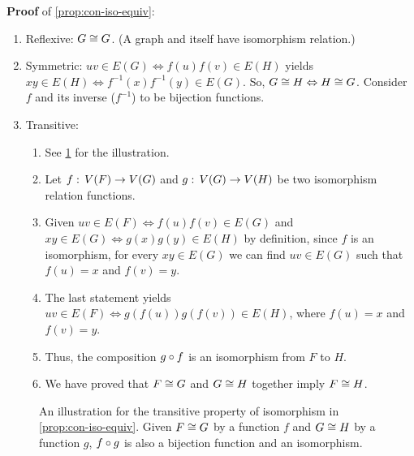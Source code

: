\documentclass[../src/handouts/main.tex]{subfiles}
\begin{document}
\textbf{Proof} of \cref{prop:con-iso-equiv}:

\begin{enumerate}
  \item Reflexive: $G \cong G$. (A graph and itself have isomorphism relation.)
  \item Symmetric: $uv \in E(G) \iff f(u)f(v) \in E(H)$ yields $xy \in E(H) \iff f^{-1}(x)f^{-1}(y) \in E(G)$. So, $G \cong H \Leftrightarrow H \cong G$. Consider $f$ and its inverse ($f^{-1}$) to be bijection functions.
  \item Transitive:
    \begin{enumerate}
      \item See \cref{fig:con-iso-equiv} for the illustration.
      \item Let $f:\, V(F) \to V(G)$ and $g:\, V(G) \to V(H)$ be two isomorphism relation functions.
      \item Given $uv \in E(F) \iff f(u)f(v) \in E(G)$ and $xy \in E(G) \iff g(x)g(y) \in E(H)$ by definition, since $f$ is an isomorphism, for every $xy \in E(G)$ we can find $uv \in E(G)$ such that $f(u) = x$ and $f(v) = y$.
      \item The last statement yields $uv \in E(F) \iff g(f(u))g(f(v)) \in E(H)$, where $f(u) = x$ and $f(v) = y$.
      \item Thus, the composition $g \circ f$ is an isomorphism from $F$ to $H$.
      \item We have proved that $F \cong G$ and $G \cong H$ together imply $F \cong H$.
    \end{enumerate}
\end{enumerate}

\begin{figure}[htbp]
  \def\hoffset{3cm}%
  \def\voffset{1.2cm}%
  \def\domain#1#2{\draw[fill=#2] (\hoffset * #1, 0) ellipse (1cm and 2cm)}%
  \def\elements#1#2#3#4{
    \node[main] (#3) at (\hoffset * #1, \voffset) {$#3$}
    node[main] (#4) at (\hoffset * #1, 0) {$#4$}
    node at (\hoffset * #1, -\voffset) {$#2$};
    \draw[edge] (#3) -- (#4)
  }
  \centering
  \caption{An illustration for the transitive property of isomorphism in \cref{prop:con-iso-equiv}. Given $F \cong G$ by a function $f$ and $G \cong H$ by a function $g$, $f \circ g$ is also a bijection function and an isomorphism.}
  \label{fig:con-iso-equiv}
\end{figure}
\end{document}
